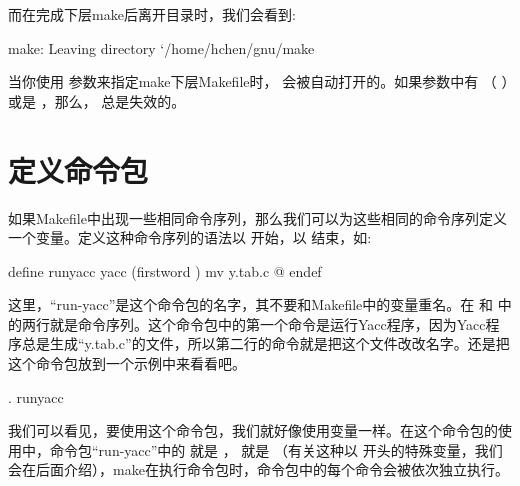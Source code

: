 \documentclass[a4paper,10pt]{sphinxmanual}
\begin{document}
而在完成下层make后离开目录时，我们会看到:

\begin{sphinxVerbatim}[commandchars=\\\{\}]
make: Leaving directory {}`/home/hchen/gnu/make\PYGZsq{}
\end{sphinxVerbatim}

当你使用  参数来指定make下层Makefile时，  会被自动打开的。如果参数中有
 （  ）或是  ，那么，  总是失效的。


\section{定义命令包}
\label{\detokenize{recipes:id5}}
如果Makefile中出现一些相同命令序列，那么我们可以为这些相同的命令序列定义一个变量。定义这种命令序列的语法以  开始，以  结束，如:

\begin{sphinxVerbatim}[commandchars=\\\{\}]
define run\PYGZhy{}yacc
yacc \PYGZdl{}(firstword \PYGZdl{}\PYGZca{})
mv y.tab.c \PYGZdl{}@
endef
\end{sphinxVerbatim}

这里，“run-yacc”是这个命令包的名字，其不要和Makefile中的变量重名。在  和
 中的两行就是命令序列。这个命令包中的第一个命令是运行Yacc程序，因为Yacc程序总是生成“y.tab.c”的文件，所以第二行的命令就是把这个文件改改名字。还是把这个命令包放到一个示例中来看看吧。

\begin{sphinxVerbatim}[commandchars=\\\{\}]
 .
    run\PYGZhy{}yacc
\end{sphinxVerbatim}

我们可以看见，要使用这个命令包，我们就好像使用变量一样。在这个命令包的使用中，命令包“run-yacc”中的 \sphinxcode{\sphinxupquote{\$\textasciicircum{}}} 就是  ，   就是  （有关这种以 \sphinxcode{\sphinxupquote{\$}}
开头的特殊变量，我们会在后面介绍），make在执行命令包时，命令包中的每个命令会被依次独立执行。
\end{document}
